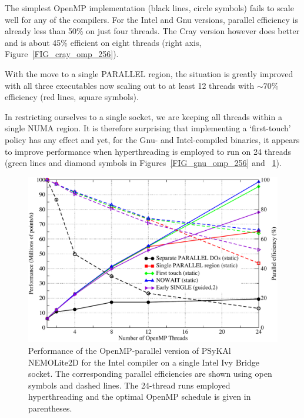 \documentclass[gmd, manuscript]{copernicus}
\newlength{\picwidth}
\begin{document}
The simplest OpenMP implementation (black lines, circle symbols) fails
to scale well for any of the compilers. For the Intel and Gnu
versions, parallel efficiency is already less than 50\% on just four
threads. The Cray version however does better and is about 45\%
efficient on eight threads (right axis, Figure~\ref{FIG_cray_omp_256}).

With the move to a single PARALLEL region, the situation
is greatly improved with all three executables now scaling out to at
least 12 threads with $\sim70$\% efficiency (red lines, square symbols).

In restricting ourselves to a single socket, we are keeping all
threads within a single NUMA region. It is therefore surprising that
implementing a `first-touch' policy has any effect and yet, for the
Gnu- and Intel-compiled binaries, it appears to improve performance
when hyperthreading is employed to run on 24 threads (green lines and
diamond symbols in Figures~\ref{FIG_gnu_omp_256} and
~\ref{FIG_intel_omp_256}).

\begin{figure}
\centering
\includegraphics[width=\picwidth]{omp_scaling_256_intel}
\caption{Performance of the OpenMP-parallel version of {PS}y{KA}l
  NEMOLite2D for the Intel compiler on a single Intel Ivy Bridge
  socket.  The corresponding parallel efficiencies are shown using
  open symbols and dashed lines. The 24-thread runs employed
  hyperthreading and the optimal OpenMP schedule is given in
  parentheses.}
\label{FIG_intel_omp_256}
\end{figure}
\end{document}
